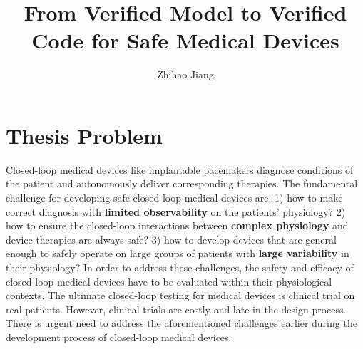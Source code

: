 \documentclass[a4paper]{article}
\title{From Verified Model to Verified Code for Safe Medical Devices}
\author{Zhihao Jiang}
\begin{document}
\maketitle


\section*{Thesis Problem}
Closed-loop medical devices like implantable pacemakers diagnose conditions of the patient and autonomously deliver corresponding therapies.
The fundamental challenge for developing safe closed-loop medical devices are: 
1) how to make correct diagnosis with \textbf{limited observability} on the patients' physiology? 
2) how to ensure the closed-loop interactions between \textbf{complex physiology} and device therapies are always safe?
3) how to develop devices that are general enough to safely operate on large groups of patients with \textbf{large variability} in their physiology?
In order to address these challenges, the safety and efficacy of closed-loop medical devices have to be evaluated within their physiological contexts. 
The ultimate closed-loop testing for medical devices is clinical trial on real patients.
However, clinical trials are costly and late in the design process. 
There is urgent need to address the aforementioned challenges earlier during the development process of closed-loop medical devices.
\end{document}
